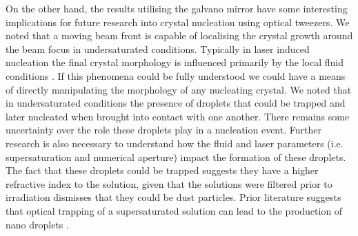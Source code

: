 On the other hand, the results utilising the galvano mirror 
have some interesting implications for future research into 
crystal nucleation using optical tweezers. We noted that a 
moving beam front is capable of localising the crystal growth
around the beam focus in undersaturated conditions. Typically
in laser induced nucleation the final crystal morphology is 
influenced primarily by the local fluid conditions 
\cite{Flannigan2023, Liao2022}. If this phenomena could be 
fully understood we could have a means of directly manipulating 
the morphology of any nucleating crystal. We noted that in 
undersaturated conditions the presence of droplets that could 
be trapped and later nucleated when brought into contact with 
one another. There remains some uncertainty over the role these 
droplets play in a nucleation event. Further research is also 
necessary to understand how the fluid and laser parameters 
(i.e. supersaturation and numerical aperture) impact the 
formation of these droplets. The fact that these droplets could 
be trapped suggests they have a higher refractive index to the 
solution, given that the solutions were filtered prior to 
irradiation dismisses that they could be dust particles. Prior 
literature suggests that optical trapping of a supersaturated 
solution can lead to the production of nano droplets 
\cite{Gowayed2021, Tsuboi2009}. 


